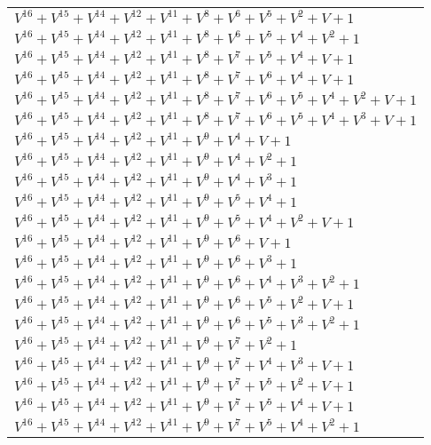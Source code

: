 \documentclass[12pt]{article}
\begin{document}
\begin{adjustwidth}{-4cm}{}
\begin{center}
\begin{longtable}{|l|}
$V^{16}  +V^{15}  +V^{14}  +V^{12}  +V^{11}  +V^{8}  +V^{6}  +V^{5}  +V^{2}  + V + 1$ \\
$V^{16}  +V^{15}  +V^{14}  +V^{12}  +V^{11}  +V^{8}  +V^{6}  +V^{5}  +V^{4}  +V^{2}  + 1$ \\
$V^{16}  +V^{15}  +V^{14}  +V^{12}  +V^{11}  +V^{8}  +V^{7}  +V^{5}  +V^{4}  + V + 1$ \\
$V^{16}  +V^{15}  +V^{14}  +V^{12}  +V^{11}  +V^{8}  +V^{7}  +V^{6}  +V^{4}  + V + 1$ \\
$V^{16}  +V^{15}  +V^{14}  +V^{12}  +V^{11}  +V^{8}  +V^{7}  +V^{6}  +V^{5}  +V^{4}  +V^{2}  + V + 1$ \\
$V^{16}  +V^{15}  +V^{14}  +V^{12}  +V^{11}  +V^{8}  +V^{7}  +V^{6}  +V^{5}  +V^{4}  +V^{3}  + V + 1$ \\
$V^{16}  +V^{15}  +V^{14}  +V^{12}  +V^{11}  +V^{9}  +V^{4}  + V + 1$ \\
$V^{16}  +V^{15}  +V^{14}  +V^{12}  +V^{11}  +V^{9}  +V^{4}  +V^{2}  + 1$ \\
$V^{16}  +V^{15}  +V^{14}  +V^{12}  +V^{11}  +V^{9}  +V^{4}  +V^{3}  + 1$ \\
$V^{16}  +V^{15}  +V^{14}  +V^{12}  +V^{11}  +V^{9}  +V^{5}  +V^{4}  + 1$ \\
$V^{16}  +V^{15}  +V^{14}  +V^{12}  +V^{11}  +V^{9}  +V^{5}  +V^{4}  +V^{2}  + V + 1$ \\
$V^{16}  +V^{15}  +V^{14}  +V^{12}  +V^{11}  +V^{9}  +V^{6}  + V + 1$ \\
$V^{16}  +V^{15}  +V^{14}  +V^{12}  +V^{11}  +V^{9}  +V^{6}  +V^{3}  + 1$ \\
$V^{16}  +V^{15}  +V^{14}  +V^{12}  +V^{11}  +V^{9}  +V^{6}  +V^{4}  +V^{3}  +V^{2}  + 1$ \\
$V^{16}  +V^{15}  +V^{14}  +V^{12}  +V^{11}  +V^{9}  +V^{6}  +V^{5}  +V^{2}  + V + 1$ \\
$V^{16}  +V^{15}  +V^{14}  +V^{12}  +V^{11}  +V^{9}  +V^{6}  +V^{5}  +V^{3}  +V^{2}  + 1$ \\
$V^{16}  +V^{15}  +V^{14}  +V^{12}  +V^{11}  +V^{9}  +V^{7}  +V^{2}  + 1$ \\
$V^{16}  +V^{15}  +V^{14}  +V^{12}  +V^{11}  +V^{9}  +V^{7}  +V^{4}  +V^{3}  + V + 1$ \\
$V^{16}  +V^{15}  +V^{14}  +V^{12}  +V^{11}  +V^{9}  +V^{7}  +V^{5}  +V^{2}  + V + 1$ \\
$V^{16}  +V^{15}  +V^{14}  +V^{12}  +V^{11}  +V^{9}  +V^{7}  +V^{5}  +V^{4}  + V + 1$ \\
$V^{16}  +V^{15}  +V^{14}  +V^{12}  +V^{11}  +V^{9}  +V^{7}  +V^{5}  +V^{4}  +V^{2}  + 1$ \\

\end{longtable}
\end{center}
\end{adjustwidth}
\end{document}
